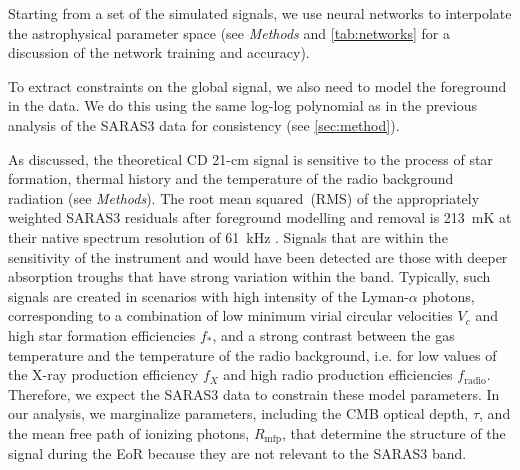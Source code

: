
Starting from a set of the simulated signals, we use neural networks \cite{Bevins_globalemu_2021} to interpolate the astrophysical parameter space (see \textit{Methods} and \cref{tab:networks} for a discussion of the network training and accuracy).

To extract constraints on the global signal, we also need to model the foreground in the data. We do this using the same log-log polynomial as in the previous analysis of the SARAS3 data  \cite{SARAS3} for consistency (see \cref{sec:method}).

As discussed, the theoretical CD 21-cm signal is sensitive to the process of star formation, thermal history and the temperature of the radio background radiation (see \textit{Methods}). The root mean squared~(RMS) of the appropriately weighted SARAS3 residuals after foreground modelling and removal is 213~mK at their native spectrum resolution of 61~kHz \cite{SARAS3}. Signals that are within the sensitivity of the instrument and would have been detected are those with deeper absorption troughs that have strong variation within the band. Typically, such signals are created in scenarios with high intensity of the Lyman-$\alpha$ photons, corresponding to a combination of low minimum virial circular velocities $V_c$ and high star formation efficiencies $f_*$, and a strong contrast between the gas temperature and the temperature of the radio background, i.e. for low values of the X-ray production efficiency $f_X$ and high radio production efficiencies $f_\mathrm{radio}$. Therefore, we expect the SARAS3 data to constrain these model parameters. In our analysis, we marginalize parameters, including the CMB optical depth, $\tau$, and the mean free path of ionizing photons, $R_\mathrm{mfp}$, that determine the structure of the signal during the EoR because they are not relevant to the SARAS3 band.

